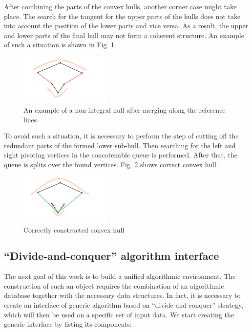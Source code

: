 \documentclass[twoside,twocolumn,10pt]{article}
\begin{document}
		After combining the parts of the convex hulls, another corner case might take place. The search for the tangent for the upper parts of the hulls does not take into account the position of the lower parts and vice versa. As a result, the upper and lower parts of the final hull may not form a coherent structure. An example of such a situation is shown in Fig. \ref{fig:incorect_lower_subhull}.

		\begin{figure}[htb]
			\centering
			\includegraphics[width=0.4\textwidth, height=0.2\textheight]{incorect_lower_subhull}
			\caption{An example of a non-integral hull after merging along the reference lines}
			\label{fig:incorect_lower_subhull}
		\end{figure}

		To avoid such a situation, it is necessary to perform the step of cutting off the redundant parts of the formed lower sub-hull. Then searching for the left and right pivoting vertices in the concatenable queue is performed. After that, the queue is splits over the found vertices.
		Fig. \ref{fig:correct_convex_hull} shows correct convex hull.

		\begin{figure}[htbp]
			\centering
			\includegraphics[width=0.4\textwidth, height=0.2\textheight]{correct_convex_hull}
			\caption{Correctly constructed convex hull}
			\label{fig:correct_convex_hull}
		\end{figure}

\subsection{``Divide-and-conquer'' algorithm interface}

		The next goal of this work is to build a unified algorithmic environment. The construction of such an object requires the combination of an algorithmic database together with the necessary data structures.  In fact, it is necessary to create an interface of generic algorithm based on ``divide-and-conquer'' strategy, which will then be used on a specific set of input data.
		We start creating the generic interface by listing its components:
\end{document}
